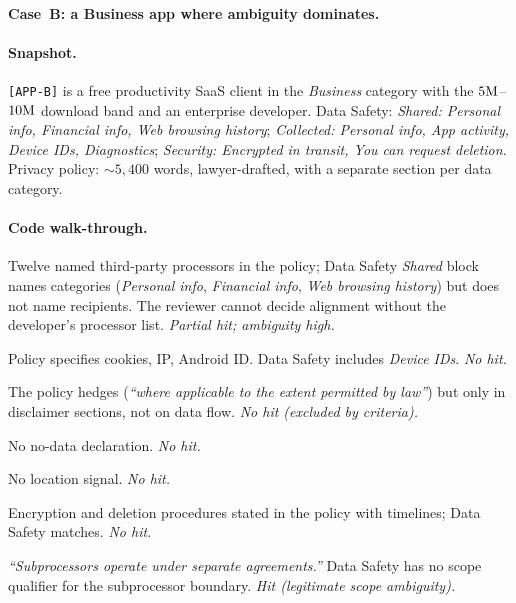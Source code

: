 \documentclass[11pt,a4paper]{article}
\newcommand{\code}[1]{\textsf{\textbf{#1}}}
\begin{document}
\paragraph{Case~B: a Business app where ambiguity dominates.}
\paragraph{Snapshot.} \texttt{[APP-B]} is a free productivity SaaS
client in the \emph{Business} category with the $5{\rm M}$--$10{\rm M}$
download band and an enterprise developer. Data Safety:
\textsl{Shared: Personal info, Financial info, Web browsing history};
\textsl{Collected: Personal info, App activity, Device IDs, Diagnostics};
\textsl{Security: Encrypted in transit, You can request deletion}.
Privacy policy: $\sim 5{,}400$ words, lawyer-drafted, with a separate
section per data category.

\paragraph{Code walk-through.}
\begin{description}[topsep=2pt,itemsep=2pt,leftmargin=1.6em]
\item[\code{M1}] Twelve named third-party processors in the policy;
Data Safety \textsl{Shared} block names categories (\emph{Personal
info}, \emph{Financial info}, \emph{Web browsing history}) but does
not name recipients. The reviewer cannot decide alignment without
the developer's processor list. \emph{Partial hit; ambiguity high.}
\item[\code{M2}] Policy specifies cookies, IP, Android ID. Data Safety
includes \textsl{Device IDs}. \emph{No hit.}
\item[\code{M3}] The policy hedges
(\emph{``where applicable to the extent permitted by law''}) but only
in disclaimer sections, not on data flow. \emph{No hit (excluded by
criteria).}
\item[\code{M4}] No no-data declaration. \emph{No hit.}
\item[\code{M5}] No location signal. \emph{No hit.}
\item[\code{M6}] Encryption and deletion procedures stated in the
policy with timelines; Data Safety matches. \emph{No hit.}
\item[\code{M7}] \emph{``Subprocessors operate under separate
agreements.''} Data Safety has no scope qualifier for the
subprocessor boundary. \emph{Hit (legitimate scope ambiguity).}
\end{description}
\end{document}
